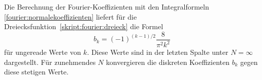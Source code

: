 Die Berechnung der Fourier-Koeffizienten mit den Integralformeln
\eqref{fourier:normalekoeffizienten}
liefert für die Dreiecksfunktion~\eqref{skript:fourier:dreieck}
die Formel
\[
b_k = (-1)^{(k-1)/2}\frac{8}{\pi^2k^2}
\]
für ungereade Werte von $k$.
Diese Werte sind in der letzten Spalte unter $N=\infty$ dargestellt.
Für zunehmendes $N$ konvergieren die diskreten Koeffizienten $b_k$ gegen 
diese stetigen Werte.

